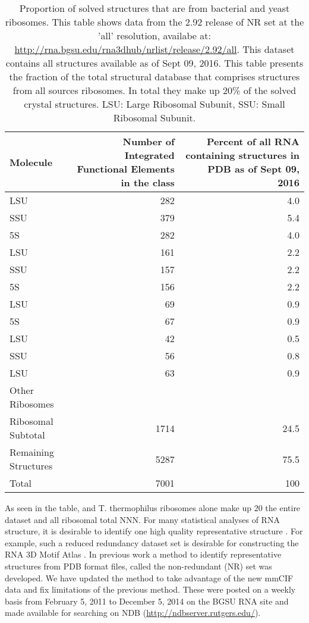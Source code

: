 \begin{table}
  \begin{tabulary}{\linewidth}{LRR}
    \toprule
    Molecule &
      Number of Integrated Functional Elements in the class &
      Percent of all RNA containing structures in PDB as of Sept 09, 2016 \\
    \midrule
    \TT{} LSU            & 282  & 4.0  \\
    \TT{} SSU            & 379  & 5.4  \\
    \TT{} 5S             & 282  & 4.0  \\
    \EC{} LSU            & 161  & 2.2  \\
    \EC{} SSU            & 157  & 2.2  \\
    \EC{} 5S             & 156  & 2.2  \\
    \HM{} LSU            & 69   & 0.9  \\
    \HM{} 5S             & 67   & 0.9  \\
    \DR{} LSU            & 42   & 0.5  \\
    \SC{} SSU            & 56   & 0.8  \\
    \SC{} LSU            & 63   & 0.9  \\
    Other Ribosomes      &      &      \\
    Ribosomal Subtotal   & 1714 & 24.5 \\
    Remaining Structures & 5287 & 75.5 \\
    Total                & 7001 & 100  \\
    \bottomrule
  \end{tabulary}
  \caption{Proportion of solved structures that are from bacterial and yeast
    ribosomes. This table shows data from the 2.92 release of NR set at the
    'all' resolution, availabe at:
    \url{http://rna.bgsu.edu/rna3dhub/nrlist/release/2.92/all}. This dataset contains
    all structures available as of Sept 09, 2016. This table presents the
    fraction of the total structural database that comprises structures from all
    sources ribosomes. In total they make up 20\% of the solved crystal
  structures. LSU: Large Ribosomal Subunit, SSU: Small Ribosomal Subunit.}
  \label{tab:mol-dist}
\end{table}

As seen in the table, \EC{} and T. thermophilus ribosomes alone make up 20%
the entire dataset and all ribosomal total NNN. For many statistical analyses of
RNA structure, it is desirable to identify one high quality representative
structure \cite{Leontis2012b}. For example, such a reduced redundancy dataset
set is desirable for constructing the RNA 3D Motif Atlas \cite{Petrov2013}. In
previous work a method to identify representative structures  from PDB format
files, called the non-redundant (NR) set was developed. We have updated the
method to take advantage of the new mmCIF data and fix limitations of the
previous method. These were posted on a weekly basis from February 5, 2011 to
December 5, 2014 on the BGSU RNA site and made available for searching on NDB
(\url{http://ndbserver.rutgers.edu/}).

